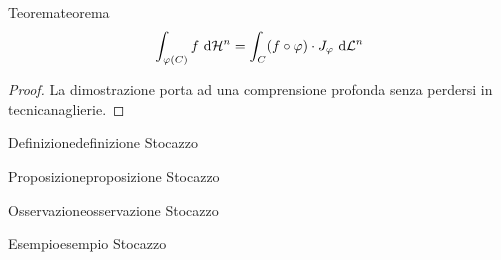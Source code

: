 \documentclass{article}
\begin{document}
\begin{theorem}{Teorema}{teorema}
    \[\int_{\varphi(C)} f \text{ d} \mathcal{H}^n = \int_{C} (f\circ \varphi) \cdot J_\varphi \text{ d} \mathcal{L}^n\]
\end{theorem}

\begin{proof}
    La dimostrazione porta ad una comprensione profonda senza perdersi in tecnicanaglierie.
\end{proof}

\begin{definition}{Definizione}{definizione}
    Stocazzo
\end{definition}

\begin{proposition}{Proposizione}{proposizione}
    Stocazzo
\end{proposition}

\begin{remark}{Osservazione}{osservazione}
    Stocazzo
\end{remark}

\begin{example}{Esempio}{esempio}
    Stocazzo
\end{example}
\end{document}
